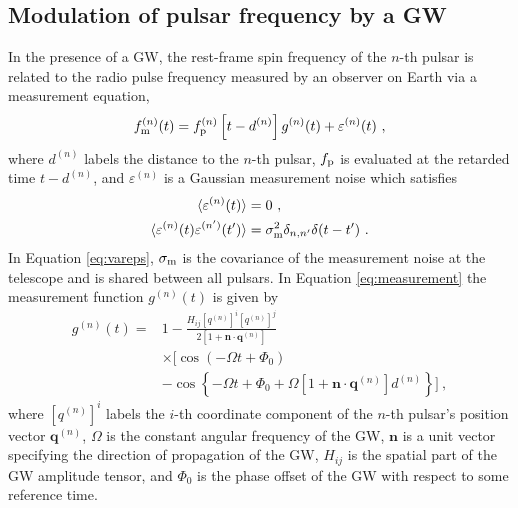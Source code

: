\documentclass[fleqn,usenatbib,useAMS]{mnras}
\begin{document}
\subsection{Modulation of pulsar frequency by a GW} \label{sec:psr_measured}
In the presence of a GW, the rest-frame spin frequency of the $n$-th pulsar is related to the radio pulse frequency measured by an observer on Earth via a measurement equation,
\begin{equation}
	f_{\rm m}^{(n)}(t) = f_{\rm p}^{(n)}\left [t-d^{(n)} \right ] g^{(n)}(t) +  \varepsilon^{(n)}(t)\ ,
	\label{eq:measurement}
\end{equation}
where $d^{(n)}$ labels the distance to the $n$-th pulsar, $f_{\rm p}$ is evaluated at the retarded time $t-d^{(n)}$, and $\varepsilon^{(n)}$ is a Gaussian measurement noise which satisfies 
\begin{align}
	\langle \varepsilon^{(n)}(t) \rangle &= 0 \ , \\
	\langle \varepsilon^{(n)}(t) \varepsilon^{(n')}(t') \rangle &= \sigma_{\rm m}^2 \delta_{n,n'} \delta(t - t') \ .	\label{eq:vareps}
\end{align}
In Equation \eqref{eq:vareps}, $\sigma_{\rm m}$ is the covariance of the measurement noise at the telescope and is shared between all pulsars. In Equation \eqref{eq:measurement} the measurement function $g^{(n)}(t)$ is given by \citep[e.g.][]{Maggiore}
\begin{align}
	g^{(n)}(t) =& 1 - \frac{ H_{ij}[q^{(n)}]^i [q^{(n)}]^j }{2 [1 + \boldsymbol{n}\cdot \boldsymbol{q}^{(n)}] } \nonumber \\
	& \times \Big[\cos\left(-\Omega t +\Phi_0\right) \nonumber \\
	&- \cos \left \{-\Omega t +\Phi_0 + \Omega \left[1 + \boldsymbol{n}\cdot \boldsymbol{q}^{(n)} \right]  d^{(n)} \right \} \Big ] \ ,
	\label{eq:g_func_trig}
\end{align}
where $[q^{(n)}]^i$ labels the $i$-th coordinate component of the $n$-th pulsar's position vector $\boldsymbol{q}^{(n)}$, $\Omega$ is the constant angular frequency of the GW, $\boldsymbol{n}$ is a unit vector specifying the direction of propagation of the GW, $H_{ij}$ is the spatial part of the GW amplitude tensor, and $\Phi_0$ is the phase offset of the GW with respect to some reference time. \newline  
\end{document}
